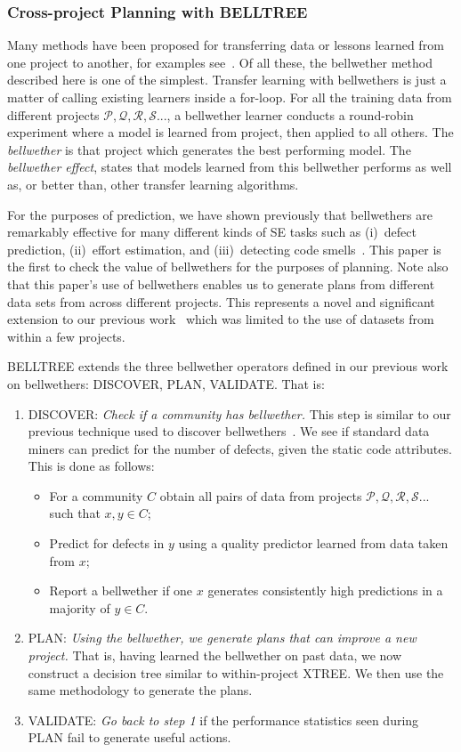 \documentclass[smallextended]{svjour3}       %
\newcommand{\bi}{\begin{itemize}} %
\newcommand{\ei}{\end{itemize}}
\newcommand{\be}{\begin{enumerate}}
\newcommand{\ee}{\end{enumerate}}
\begin{document}
\subsubsection{Cross-project Planning with BELLTREE}
\label{sect:CPXTREE}

Many methods have been proposed for transferring data or lessons
learned from one project to another, for examples see~\cite{Nam2013, Nam2015, jing15, kocaguneli2011find, kocaguneli2012, turhan09, peters15}. Of all these, the bellwether method described here is one of the simplest.
Transfer learning with bellwethers is just a matter of calling existing
learners inside a for-loop. For all the training data from different projects $\mathcal{P, Q, R, S...}$, 
a bellwether learner conducts a round-robin experiment where a model is learned from project, then applied to all others. The {\em bellwether} is that project which generates the best performing model. The {\em bellwether effect}, states that models
learned from this bellwether performs as well as, or better than, other transfer learning algorithms. 

For the purposes of prediction, we have shown previously that bellwethers are remarkably
effective for many different kinds of SE tasks such as (i)~defect prediction, (ii)~effort
estimation, and (iii)~detecting code smells~\cite{krishna17b}. This paper is the first to check the value of bellwethers for the purposes of planning. Note also that this paper's use of bellwethers enables us to generate plans from different data sets from across different projects. This represents a novel and significant extension to our previous work~\cite{krishna17a} which was limited to the use of datasets from within a few projects.



BELLTREE extends the three bellwether operators defined in our previous work~\cite{krishna17b} on bellwethers: DISCOVER, PLAN, VALIDATE. That is:~ 
\be
  \item DISCOVER: {\em Check if a community has bellwether.} 
  This step is similar to our previous technique used to discover bellwethers~\cite{krishna16}. We see if standard data miners can predict for the number of defects, given the static code attributes. This is done as follows:~ 
  \bi 
  \item
  For a community $C$ obtain all pairs of data from
  projects $\mathcal{P, Q, R, S...}$ such that $x, y \in C$;
  \item
  Predict for defects in $y$ using a quality predictor learned from data taken from $x$;
  \item
  Report a bellwether if one $x$ generates consistently high predictions in a majority of $y \in C$.
  \ei
  \item PLAN: {\em Using the bellwether, we generate plans that can improve a new project.} That is, 
  having learned the bellwether on past data, we now construct a decision tree similar to within-project XTREE. We then use the same methodology to generate the plans.
  \item VALIDATE: {\em Go back to step 1} if the performance statistics seen during PLAN fail to generate useful actions.
  \ee
  
\end{document}
